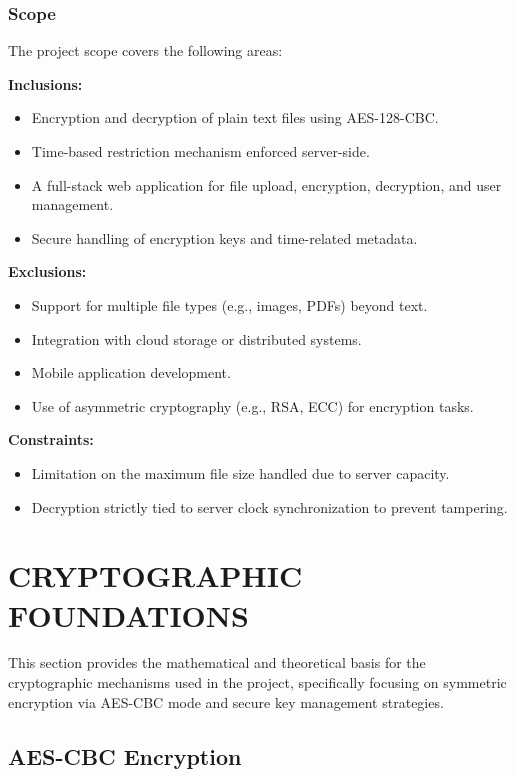 \documentclass[12pt]{article}
\begin{document}
\subsubsection{Scope}

The project scope covers the following areas:

\textbf{Inclusions:}
\begin{itemize}
    \item Encryption and decryption of plain text files using AES-128-CBC.
    \item Time-based restriction mechanism enforced server-side.
    \item A full-stack web application for file upload, encryption, decryption, and user management.
    \item Secure handling of encryption keys and time-related metadata.
\end{itemize}

\textbf{Exclusions:}
\begin{itemize}
    \item Support for multiple file types (e.g., images, PDFs) beyond text.
    \item Integration with cloud storage or distributed systems.
    \item Mobile application development.
    \item Use of asymmetric cryptography (e.g., RSA, ECC) for encryption tasks.
\end{itemize}

\textbf{Constraints:}
\begin{itemize}
    \item Limitation on the maximum file size handled due to server capacity.
    \item Decryption strictly tied to server clock synchronization to prevent tampering.
\end{itemize}


\section{CRYPTOGRAPHIC FOUNDATIONS}\label{sec:crypto}

This section provides the mathematical and theoretical basis for the cryptographic mechanisms used in the project, specifically focusing on symmetric encryption via AES-CBC mode and secure key management strategies.

\subsection{AES-CBC Encryption}
\end{document}
